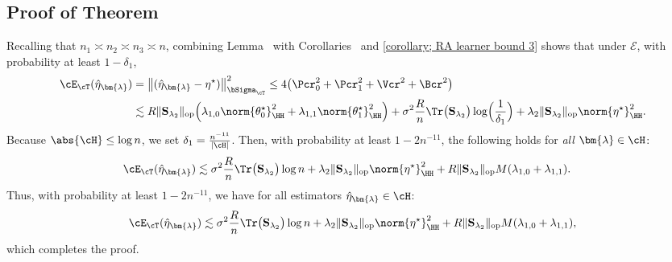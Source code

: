 \documentclass[12pt,a4paper,pdftex,onepage]{article}
\newcommand{\op}{\operatorname{op}}
\newcommand{\sig}{\sigma}
\newcommand{\Sbar}{\mathbf{S}}
\newcommand{\event}{\mathscr{E}}
\begin{document}
\subsection{Proof of Theorem~}
\noindent
Recalling that \(n_1 \asymp n_2 \asymp n_3 \asymp n\), combining Lemma~ with Corollaries~ and \ref{corollary; RA learner bound 3} shows that under \(\event\), with probability at least \(1-\delta_1\),
\begin{align*}
\cE_{\cT}(\hat{\eta}_{\bm{\lambda}}) 
&=\bigl\|(\hat{\eta}_{\bm{\lambda}} -\eta^\star)\bigr\|_{\bSigma_{\cT}}^2 
\leq 4\bigl(\Pcr_0^2 + \Pcr_1^2 + \Vcr^2 + \Bcr^2 \bigr)\\
&\lesssim R\|\Sbar_{\lambda_2} \|_{\op}\Bigl(\lambda_{1,0}\norm{\theta_0^\star}_\HH^2+\lambda_{1,1}\norm{\theta_1^\star}_\HH^2\Bigr)+\sig^2\frac{R}{n}\Tr\bigl(\Sbar_{\lambda_2}\bigr)\log \Bigl(\frac{1}{\delta_1}\Bigr) 
+ \lambda_2\|\Sbar_{\lambda_2} \|_{\op}\norm{\eta^\star}^2_\HH.
\end{align*}
Because \(\abs{\cH} \leq \log n\), we set \(\delta_1 =\frac{n^{-11}}{|\cH|}\). Then, with probability at least \(1-2n^{-11}\), the following holds for \emph{all} \(\bm{\lambda} \in \cH\):
\begin{align*}
\cE_{\cT}(\hat{\eta}_{\bm{\lambda}}) 
&\lesssim  \sig^2\frac{R}{n}\Tr\bigl(\Sbar_{\lambda_2}\bigr)\log n 
+\lambda_2 \|\Sbar_{\lambda_2} \|_{\op}\norm{\eta^\star}^2_\HH 
+R\|\Sbar_{\lambda_2} \|_{\op} M(\lambda_{1,0} + \lambda_{1,1}).
\end{align*}
Thus, with probability at least \(1-2n^{-11}\), we have for all estimators \(\hat{\eta}_{\bm{\lambda}} \in \cH\):
\[
\cE_{\cT}(\hat{\eta}_{\bm{\lambda}}) 
\lesssim \sig^2\frac{R}{n}\Tr\bigl(\Sbar_{\lambda_2}\bigr)\log n 
+\lambda_2 \|\Sbar_{\lambda_2} \|_{\op}\norm{\eta^\star}^2_\HH 
+R\|\Sbar_{\lambda_2} \|_{\op}M(\lambda_{1,0} + \lambda_{1,1}),
\]
which completes the proof.
\end{document}
